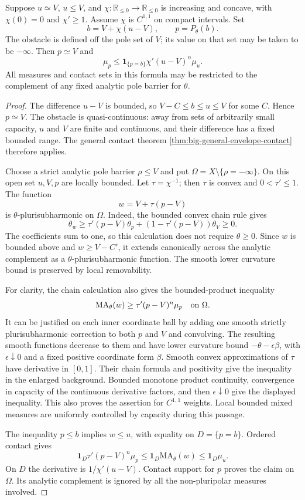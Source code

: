 \begin{lemma}\label{lem:big-concave-envelope}
Suppose $u\simeq V$, $u\leq V$, and $\chi:\mathbb R_{\leq0}\to\mathbb R_{\leq0}$ is increasing and concave, with $\chi(0)=0$ and $\chi'\geq1$. Assume $\chi$ is $C^{1,1}$ on compact intervals. Set
\[
 b=V+\chi(u-V),\qquad p=P_\theta(b).
\]
The obstacle is defined off the pole set of $V$; its value on that set may be taken to be $-\infty$. Then $p\simeq V$ and
\[
 \mu_p\leq\mathbf1_{\{p=b\}}\chi'(u-V)^n\mu_u.
\]
All measures and contact sets in this formula may be restricted to the complement of any fixed analytic pole barrier for $\theta$.
\end{lemma}
\begin{proof}
The difference $u-V$ is bounded, so $V-C\leq b\leq u\leq V$ for some $C$. Hence $p\simeq V$. The obstacle is quasi-continuous: away from sets of arbitrarily small capacity, $u$ and $V$ are finite and continuous, and their difference has a fixed bounded range. The general contact theorem \cref{thm:big-general-envelope-contact} therefore applies.

Choose a strict analytic pole barrier $\rho\leq V$ and put $\Omega=X\setminus\{\rho=-\infty\}$. On this open set $u,V,p$ are locally bounded. Let $\tau=\chi^{-1}$; then $\tau$ is convex and $0<\tau'\leq1$. The function
\[
 w=V+\tau(p-V)
\]
is $\theta$-plurisubharmonic on $\Omega$. Indeed, the bounded convex chain rule gives
\[
 \theta_w\geq\tau'(p-V)\theta_p+
                     (1-\tau'(p-V))\theta_V\geq0.
\]
The coefficients sum to one, so this calculation does not require $\theta\geq0$. Since $w$ is bounded above and $w\geq V-C'$, it extends canonically across the analytic complement as a $\theta$-plurisubharmonic function. The smooth lower curvature bound is preserved by local removability.

For clarity, the chain calculation also gives the bounded-product inequality
\[
 \mathrm{MA}_\theta(w)\geq\tau'(p-V)^n\mu_p
 \quad\hbox{on }\Omega.
\]
It can be justified on each inner coordinate ball by adding one smooth strictly plurisubharmonic correction to both $p$ and $V$ and convolving. The resulting smooth functions decrease to them and have lower curvature bound $-\theta-\epsilon\beta$, with $\epsilon\downarrow0$ and a fixed positive coordinate form $\beta$. Smooth convex approximations of $\tau$ have derivative in $[0,1]$. Their chain formula and positivity give the inequality in the enlarged background. Bounded monotone product continuity, convergence in capacity of the continuous derivative factors, and then $\epsilon\downarrow0$ give the displayed inequality. This also proves the assertion for $C^{1,1}$ weights. Local bounded mixed measures are uniformly controlled by capacity during this passage.

The inequality $p\leq b$ implies $w\leq u$, with equality on $D=\{p=b\}$. Ordered contact gives
\[
 \mathbf1_D\tau'(p-V)^n\mu_p
 \leq\mathbf1_D\mathrm{MA}_\theta(w)
 \leq\mathbf1_D\mu_u.
\]
On $D$ the derivative is $1/\chi'(u-V)$. Contact support for $p$ proves the claim on $\Omega$. Its analytic complement is ignored by all the non-pluripolar measures involved.
\end{proof}

